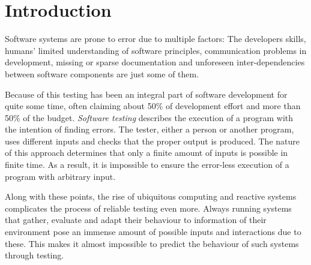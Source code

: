 \chapter{Introduction}
Software systems are prone to error due to multiple factors: The developers skills, humans' limited understanding of software principles, communication problems in development, missing or sparse documentation and unforeseen inter-dependencies between software components are just some of them.

Because of this testing has been an integral part of software development for quite some time, often claiming about 50\% of development effort and more than 50\% of the budget.\cite{Myers2011}
\emph{Software testing} describes the execution of a program with the intention of finding errors.
The tester, either a person or another program, uses different inputs and checks that the proper output is produced.
The nature of this approach determines that only a finite amount of inputs is possible in finite time.
As a result, it is impossible to ensure the error-less execution of a program with arbitrary input.

Along with these points, the rise of ubiquitous computing and reactive systems complicates the process of reliable testing even more.
Always running systems that gather, evaluate and adapt their behaviour to information of their environment pose an immense amount of possible inputs and interactions due to these.
This makes it almost impossible to predict the behaviour of such systems through testing.

